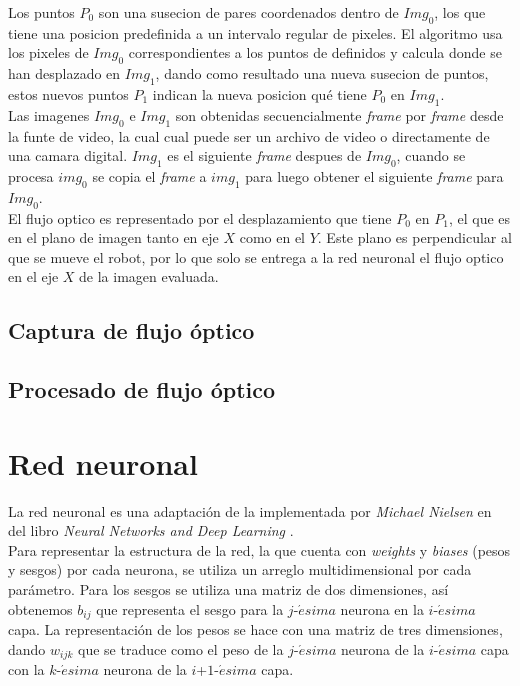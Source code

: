 \documentclass{iccmemoria}
\begin{document}
Los puntos $P_0$ son una susecion de pares coordenados dentro de $Img_0$, los que tiene una posicion predefinida a un intervalo regular de pixeles. El algoritmo usa los pixeles de $Img_0$ correspondientes a los puntos de definidos y calcula donde se han desplazado en $Img_1$, dando como resultado una nueva susecion de puntos, estos nuevos puntos $P_1$ indican la nueva posicion qué tiene $P_0$ en $Img_1$.\\

Las imagenes $Img_0$ e $Img_1$ son obtenidas secuencialmente \emph{frame} por \emph{frame} desde la funte de video, la cual cual puede ser un archivo de video o directamente de una camara digital. $Img_1$ es el siguiente \emph{frame} despues de $Img_0$, cuando se procesa $img_0$ se copia el \emph{frame} a $img_1$ para luego obtener el siguiente \emph{frame} para $Img_0$.\\

El flujo optico es representado por el desplazamiento que tiene $P_0$ en $P_1$, el que es en el plano de imagen tanto en eje $X$ como en el $Y$. Este plano es perpendicular al que se mueve el robot, por lo que solo se entrega a la red neuronal el flujo optico en el eje $X$ de la imagen evaluada.\\



\subsection{Captura de flujo óptico}

\subsection{Procesado de flujo óptico}

\section{Red neuronal}

La red neuronal es una adaptación de la implementada por \emph{Michael Nielsen} en del libro \emph{Neural Networks and Deep Learning} \cite{NeuralNetworksAndDeepLearning}.\\
 
Para representar la estructura de la red, la que cuenta con \emph{weights} y \emph{biases} (pesos y sesgos) por cada neurona, se utiliza un arreglo multidimensional por cada parámetro. Para los sesgos se utiliza una matriz de dos dimensiones, así obtenemos $b_{ij}$ que representa el sesgo para la $j$-$\acute{e}sima$ neurona en la $i$-$\acute{e}sima$ capa. La representación de los pesos se hace con una matriz de tres dimensiones, dando $w_{ijk}$ que se traduce como el peso de la $j$-$\acute{e}sima$ neurona de la $i$-$\acute{e}sima$ capa con la $k$-$\acute{e}sima$ neurona de la $i$+$1$-$\acute{e}sima$ capa.\\
 
\end{document}
